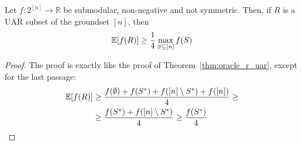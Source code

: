     \begin{theorem}
        Let $f : 2^{[n]} \rightarrow \mathbb{R}$ be submodular, non-negative and not symmetric.
        Then, if $R$ is a UAR subset of the groundset $[n]$, then
        \[ \mathbb{E}[f(R)] \geq \frac{1}{4} \max_{S \subseteq [n]} f(S) \]
    \end{theorem}

    \begin{proof}
        The proof is exactly like the proof of Theorem~\ref{thm:oracle_r_uar}, except for the last passage:
        \begin{equation*}
            \begin{split}
                \mathbb{E}[f(R)] &\geq \frac{f(\emptyset) + f(S^*) + f([n] \setminus S^*) + f([n])}{4} \geq\\
                    &\geq \frac{f(S^*) + f([n] \setminus S^*)}{4} \geq \frac{f(S^*)}{4}
            \end{split}
        \end{equation*}
    \end{proof}